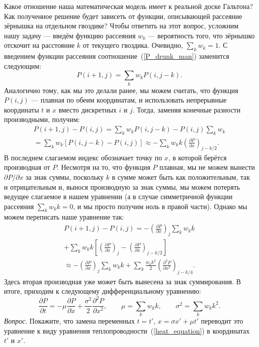 \documentclass{book}
\begin{document}
Какое отношение наша математическая модель имеет к реальной доске Гальтона? Как полученное решение
будет зависеть от функции, описывающей рассеяние зёрнышка на отдельном гвоздике? Чтобы ответить на
этот вопрос, усложним нашу задачу --- введём функцию рассеяния $w_k$ --- вероятность того, что
зёрнышко отскочит на расстояние $k$ от текущего гвоздика. Очевидно, $\sum_k w_k = 1$. С введением
функции рассеяния соотношение~(\ref{P_drunk_man}) заменится следующим:
\begin{equation}
    P(i+1, j) = \sum_k w_k P(i, j - k).
\end{equation}
Аналогично тому, как мы это делали ранее, мы можем считать, что функция $P(i, j)$ --- плавная по
обеим координатам, и использовать непрерывные координаты $t$ и $x$ вместо дискретных $i$ и $j$.
Тогда, заменяя конечные разности производными, получим:
\begin{multline}
    P(i + 1, j) - P(i, j) = \sum_k w_k P(i, j - k) - P(i, j) \sum_k w_k \\
    = \sum_k w_k \left[ P(i, j - k) - P(i, j) \right] \approx - \sum_k w_k k \left( \frac{\partial
    P}{\partial x} \right)_{j - k/2}.
\end{multline}
В последнем слагаемом индекс обозначает точку по $x$, в которой берётся производная от $P$.
Несмотря на то, что функция $P$ плавная, мы не можем вынести $\partial P / \partial x$ за знак
суммы, поскольку $k$ в сумме может быть как положительным, так и отрицательным и, вынося
производную за знак суммы, мы можем потерять ведущее слагаемое в нашем уравнении (а в
случае симметричной функции рассеяния $\sum_k w_k k = 0$, и мы просто получим ноль в правой части).
Однако мы можем переписать наше уравнение так:
\begin{multline}
    P(i + 1, j) - P(i, j) = -\left( \frac{\partial P}{\partial x} \right)_j \sum_k w_k k \\
    + \sum_k w_k k \left[ \left( \frac{\partial P}{\partial x} \right)_j - \left( \frac{\partial
    P}{\partial x} \right)_{j - k/2} \right] \\
    \approx - \left( \frac{\partial P}{\partial x} \right)_j \sum_k w_k k + \sum_k \frac{w_k
    k^2}{2} \left( \frac{\partial^2 P}{\partial x^2} \right)_{j - k/4}.
\end{multline}
Здесь вторая производная уже может быть вынесена за знак суммирования. В итоге, приходим к
следующему дифференциальному уравнению:
\begin{equation}
    \label{heat_equation_mu_sigma}
    \frac{\partial P}{\partial t} = -\mu \frac{\partial P}{\partial x} + \frac{\sigma^2}{2}
    \frac{\partial^2 P}{\partial x^2}, \qquad \mu = \sum_k w_k k, \qquad \sigma^2 = \sum_k w_k k^2.
\end{equation}
\textit{Вопрос}. Покажите, что замена переменных $t = t'$, $x = \sigma x' + \mu t'$ переводит это
уравнение к виду уравнения теплопроводности~(\ref{heat_equation}) в координатах $t'$ и $x'$.
\end{document}
